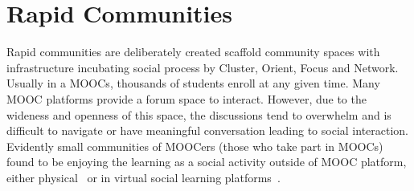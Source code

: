\documentclass[manuscript,screen,review]{acmart}
\begin{document}
%






\section{Rapid Communities}
Rapid communities are deliberately created scaffold community spaces with infrastructure incubating social process by Cluster, Orient, Focus and Network. Usually in a MOOCs, thousands of students enroll at any given time. Many MOOC platforms provide a forum space to interact. However, due to the wideness and openness of this space, the discussions tend to overwhelm and is difficult to navigate or have meaningful conversation leading to social interaction. Evidently small communities of MOOCers (those who take part in MOOCs) found to be enjoying the learning as a social activity outside of MOOC platform, either physical~\cite{damasceno2017massive} or in virtual social learning platforms~\cite{liu2016examining}.   
\end{document}
